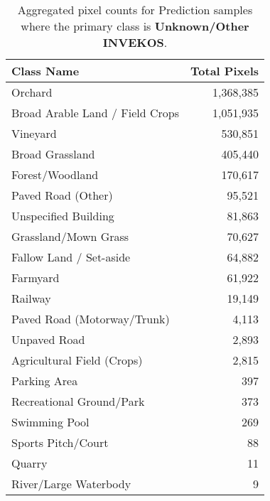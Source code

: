 \begin{table}[H] %
    \centering
    \caption{Aggregated pixel counts for Prediction samples where the primary class is \textbf{Unknown/Other INVEKOS}.}
    \label{tab:pred_counts_0}
    \begin{tabular}{lr}
        \hline
        \textbf{Class Name} & \textbf{Total Pixels} \\
        \hline
        Orchard & 1,368,385 \\
        Broad Arable Land / Field Crops & 1,051,935 \\
        Vineyard & 530,851 \\
        Broad Grassland & 405,440 \\
        Forest/Woodland & 170,617 \\
        Paved Road (Other) & 95,521 \\
        Unspecified Building & 81,863 \\
        Grassland/Mown Grass & 70,627 \\
        Fallow Land / Set-aside & 64,882 \\
        Farmyard & 61,922 \\
        Railway & 19,149 \\
        Paved Road (Motorway/Trunk) & 4,113 \\
        Unpaved Road & 2,893 \\
        Agricultural Field (Crops) & 2,815 \\
        Parking Area & 397 \\
        Recreational Ground/Park & 373 \\
        Swimming Pool & 269 \\
        Sports Pitch/Court & 88 \\
        Quarry & 11 \\
        River/Large Waterbody & 9 \\
        \hline
    \end{tabular}
\end{table}

